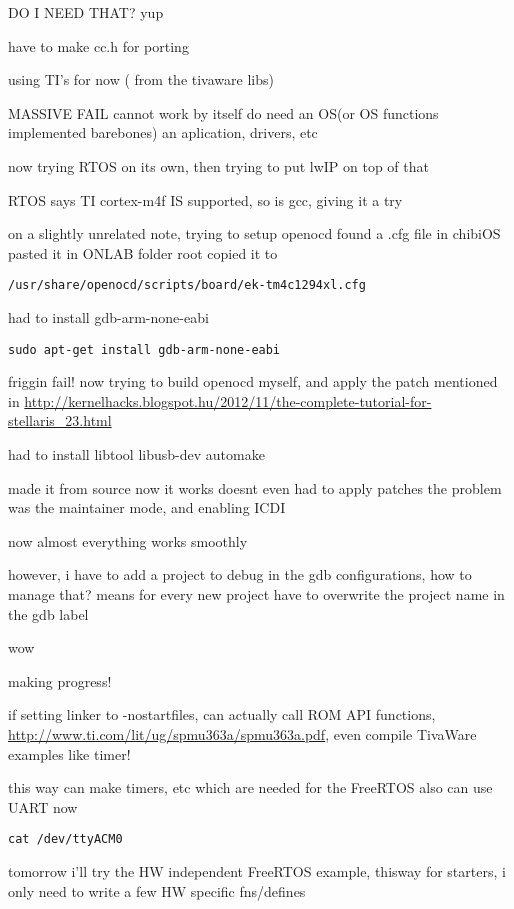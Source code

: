 \documentclass{article}
\begin{document}
DO I NEED THAT?
yup

have to make cc.h for porting

using TI's for now ( from the tivaware libs)

MASSIVE FAIL
cannot work by itself do need an OS(or OS functions implemented barebones) an aplication, drivers, etc



now trying RTOS on its own, then trying to put lwIP on top of that

RTOS says TI cortex-m4f IS supported, so is gcc, giving it a try

on a slightly unrelated note, trying to setup openocd
found a .cfg file in chibiOS
pasted it in ONLAB folder root
copied it to \begin{verbatim}/usr/share/openocd/scripts/board/ek-tm4c1294xl.cfg\end{verbatim}


had to install gdb-arm-none-eabi
\begin{verbatim}
sudo apt-get install gdb-arm-none-eabi
\end{verbatim}

friggin fail!
now trying to build openocd myself, and apply the patch mentioned in
\url{http://kernelhacks.blogspot.hu/2012/11/the-complete-tutorial-for-stellaris_23.html}

had to install libtool libusb-dev automake


made it from source now it works
doesnt even had to apply patches
the problem was the maintainer mode, and enabling ICDI

now almost everything works smoothly

however, i have to add a project to debug in the gdb configurations, how to manage that?
means for every new project have to overwrite the project name in the gdb label

wow

making progress!

if setting linker to -nostartfiles, can actually call ROM API functions,
\url{http://www.ti.com/lit/ug/spmu363a/spmu363a.pdf}, even compile TivaWare examples like timer!

this way can make timers, etc which are needed for the FreeRTOS
also can use UART now
\begin{verbatim}
cat /dev/ttyACM0
\end{verbatim}
tomorrow i'll try the HW independent FreeRTOS example, thisway for starters, i only need to write a few HW specific fns/defines
\end{document}
